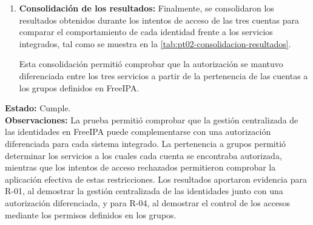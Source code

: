 \begin{enumerate}
	\item \textbf{Consolidación de los resultados:} Finalmente, se consolidaron los resultados obtenidos durante los intentos de acceso de las tres cuentas para comparar el comportamiento de cada identidad frente a los servicios integrados, tal como se muestra en la \autoref{tab:pt02-consolidacion-resultados}.

	      

	      Esta consolidación permitió comprobar que la autorización se mantuvo diferenciada entre los tres servicios a partir de la pertenencia de las cuentas a los grupos definidos en FreeIPA.
\end{enumerate}
\textbf{Estado:} Cumple.\\
\textbf{Observaciones:} La prueba permitió comprobar que la gestión centralizada de las identidades en FreeIPA puede complementarse con una autorización diferenciada para cada sistema integrado. La pertenencia a grupos permitió determinar los servicios a los cuales cada cuenta se encontraba autorizada, mientras que los intentos de acceso rechazados permitieron comprobar la aplicación efectiva de estas restricciones.
Los resultados aportaron evidencia para R-01, al demostrar la gestión centralizada de las identidades junto con una autorización diferenciada, y para R-04, al demostrar el control de los accesos mediante los permisos definidos en los grupos.

